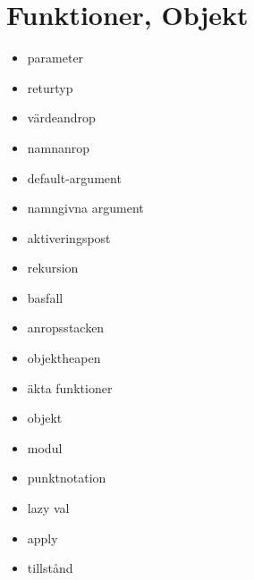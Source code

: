 \chapter{Funktioner, Objekt}\label{chapter:W03}
\begin{itemize}[nosep]
\item parameter
\item returtyp
\item värdeandrop
\item namnanrop
\item default-argument
\item namngivna argument
\item aktiveringspost
\item rekursion
\item basfall
\item anropsstacken
\item objektheapen
\item äkta funktioner
\item objekt
\item modul
\item punktnotation
\item lazy val
\item apply
\item tillstånd
\end{itemize}